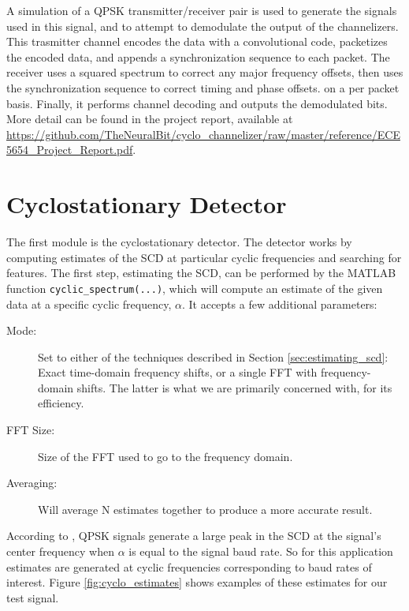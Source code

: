 \documentclass[12pt]{report}
\begin{document}
A simulation of a QPSK transmitter/receiver pair is used to generate the
signals used in this signal, and to attempt to demodulate the output of the
channelizers. This trasmitter channel encodes the data with a convolutional
code, packetizes the encoded data, and appends a synchronization sequence to
each packet. The receiver uses a squared spectrum to correct any major
frequency offsets, then uses the synchronization sequence to correct timing and
phase offsets. on a per packet basis. Finally, it performs channel decoding and
outputs the demodulated bits. More detail can be found in the project report, available at
\url{https://github.com/TheNeuralBit/cyclo_channelizer/raw/master/reference/ECE5654_Project_Report.pdf}.

\section{Cyclostationary Detector}
\label{sec:sim_cyclo}
The first module is the cyclostationary detector. The detector works by
computing estimates of the SCD at particular cyclic frequencies and searching
for features. The first step, estimating the SCD, can be performed by the
MATLAB function \texttt{cyclic\_spectrum(...)}, which will compute an estimate
of the given data at a specific cyclic frequency, $\alpha$.  It accepts a few
additional parameters:

\begin{description}
    \item[Mode:] Set to either of the techniques described in Section
    \ref{sec:estimating_scd}: Exact time-domain frequency shifts, or a single
    FFT with frequency-domain shifts. The latter is what we are primarily concerned
    with, for its efficiency.
    \item[FFT Size:] Size of the FFT used to go to the frequency domain.
    \item[Averaging:] Will average N estimates together to produce a more accurate
    result.
\end{description}

According to \cite{Gardner2}, QPSK signals generate a large peak in the SCD at
the signal's center frequency when $\alpha$ is equal to the signal baud rate.
So for this application estimates are generated at cyclic frequencies
corresponding to baud rates of interest. Figure \ref{fig:cyclo_estimates} shows
examples of these estimates for our test signal.
\end{document}
